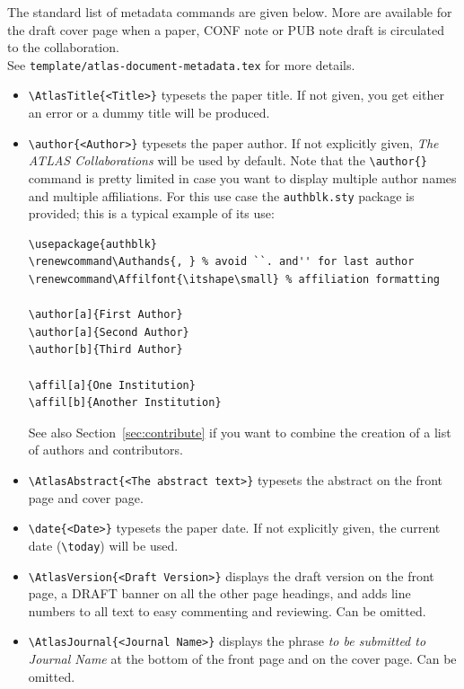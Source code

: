 \documentclass[UKenglish]{latex/atlasdoc}
\begin{document}
The standard list of metadata commands are given below.
More are available for the draft cover page when a paper, CONF note or PUB note draft
is circulated to the collaboration.\\
See \texttt{template/atlas-document-metadata.tex} for more details.

\begin{itemize}
  \item {\verb|\AtlasTitle{<Title>}|} typesets the paper title. If not
    given, you get either an error or a dummy title will be produced.

  \item {\verb|\author{<Author>}|} typesets the paper author. If not
    explicitly given, \emph{The ATLAS Collaborations} will be used by
    default. Note that the \verb|\author{}| command is pretty limited
    in case you want to display multiple author names and multiple
    affiliations. For this use case the \verb|authblk.sty| package is
    provided; this is a typical example of its use:
    \begin{verbatim}
\usepackage{authblk}
\renewcommand\Authands{, } % avoid ``. and'' for last author
\renewcommand\Affilfont{\itshape\small} % affiliation formatting

\author[a]{First Author}
\author[a]{Second Author}
\author[b]{Third Author}

\affil[a]{One Institution}
\affil[b]{Another Institution}
    \end{verbatim}
    See also Section~\ref{sec:contribute} if you want to combine the creation of a list of authors and contributors.

  \item {\verb|\AtlasAbstract{<The abstract text>}|} typesets the
    abstract on the front page and cover page.

  \item {\verb|\date{<Date>}|} typesets the paper date. If not
    explicitly given, the current date (\verb|\today|) will be used.

  \item {\verb|\AtlasVersion{<Draft Version>}|} displays the draft
    version on the front page, a DRAFT banner on all the other page
    headings, and adds line numbers to all text to easy commenting and
    reviewing. Can be omitted.

  \item {\verb|\AtlasJournal{<Journal Name>}|} displays the phrase \emph{to
    be submitted to Journal Name} at the bottom of the front page and
    on the cover page. Can be omitted.


\end{itemize}
\end{document}
